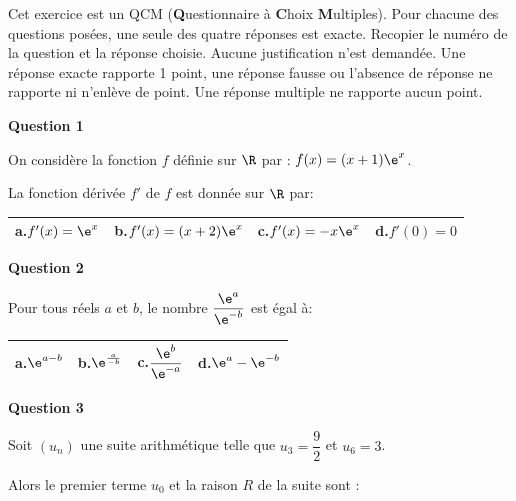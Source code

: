 \bigskip

Cet exercice est un QCM (\textbf{Q}uestionnaire à \textbf{C}hoix \textbf{M}ultiples). Pour chacune des questions posées, une seule des quatre réponses est exacte. Recopier le numéro de la question et la réponse choisie. Aucune justification n'est demandée. Une réponse exacte rapporte 1 point, une réponse fausse ou l'absence de réponse ne rapporte ni n'enlève de point. Une réponse multiple ne rapporte aucun point.

\bigskip

\textbf{Question 1}

\medskip

On considère la fonction $f$ définie sur $\R$ par : $f(x)= (x+1)\e^{x}$.

La fonction dérivée $f'$ de $f$ est donnée sur $\R$ par:

\begin{center}
{\renewcommand{\arraystretch}{1.5}
\begin{tabularx}{\linewidth}{|X|X|X|X|}
\hline
\textbf{a.}\quad $f'(x)=\e^{x}$ & \textbf{b.}\quad $f'(x)=(x+2)\e^{x}$ 
& \textbf{c.}\quad $f'(x)=-x\e^{x}$   & \textbf{d.}\quad $f'(0)=0$\\
\hline
\end{tabularx}}
\end{center}

\medskip

\textbf{Question 2}

\medskip

Pour tous réels $a$ et $b$, le nombre $\dfrac{\e^{a}}{\e^{-b}}$ est égal à:

\begin{center}
{\renewcommand{\arraystretch}{1}
\begin{tabularx}{\linewidth}{|X|X|X|X|}
\hline
\textbf{a.}\quad $\e^{a-b}$ & \textbf{b.}\quad $\e^{\frac{a}{-b}}$ 
& \textbf{c.}\quad $\dfrac{\e^{b}}{\e^{-a}}$  \rule[-10pt]{0pt}{27pt} & \textbf{d.}\quad $\e^{a}-\e^{-b}$\\
\hline
\end{tabularx}}
\end{center}

\medskip

\textbf{Question 3}

\medskip

Soit $\left(u_n\right)$  une suite arithmétique telle que $u_3= \dfrac{9}{2}$ et $u_6=3$.

Alors le premier terme $u_0$ et la raison $R$ de la suite sont :

